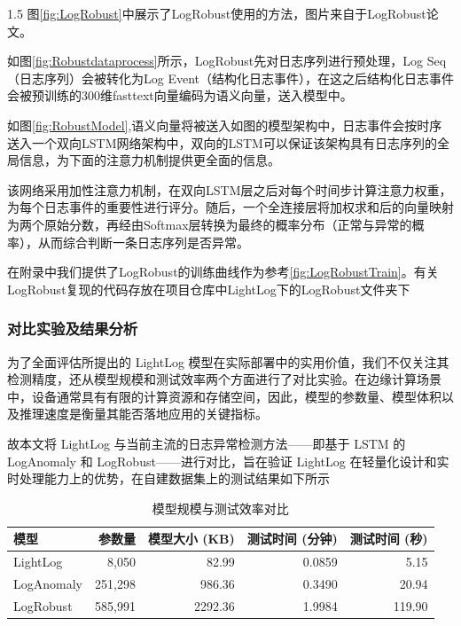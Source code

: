 \documentclass[a4paper,12pt]{report}
\begin{document}
\begin{spacing}{1.5}
图\ref{fig:LogRobust}中展示了LogRobust使用的方法，图片来自于LogRobust论文\cite{zhang2019robust}。

如图\ref{fig:Robustdataprocess}所示，LogRobust先对日志序列进行预处理，Log Seq（日志序列）会被转化为Log Event（结构化日志事件），在这之后结构化日志事件会被预训练的300维fasttext向量编码为语义向量，送入模型中。

如图\ref{fig:RobustModel},语义向量将被送入如图的模型架构中，日志事件会按时序送入一个双向LSTM网络架构中，双向的LSTM可以保证该架构具有日志序列的全局信息，为下面的注意力机制提供更全面的信息。

该网络采用加性注意力机制，在双向LSTM层之后对每个时间步计算注意力权重，为每个日志事件的重要性进行评分。随后，一个全连接层将加权求和后的向量映射为两个原始分数，再经由Softmax层转换为最终的概率分布（正常与异常的概率），从而综合判断一条日志序列是否异常。

在附录中我们提供了LogRobust的训练曲线作为参考\ref{fig:LogRobustTrain}。有关LogRobust复现的代码存放在项目仓库中LightLog下的LogRobust文件夹下


\subsubsection{对比实验及结果分析}

为了全面评估所提出的 LightLog 模型在实际部署中的实用价值，我们不仅关注其检测精度，还从模型规模和测试效率两个方面进行了对比实验。在边缘计算场景中，设备通常具有有限的计算资源和存储空间，因此，模型的参数量、模型体积以及推理速度是衡量其能否落地应用的关键指标。

故本文将 LightLog 与当前主流的日志异常检测方法——即基于 LSTM 的 LogAnomaly 和 LogRobust——进行对比，旨在验证 LightLog 在轻量化设计和实时处理能力上的优势，在自建数据集上的测试结果如下所示
\begin{table}[htbp]
	\centering
	\caption{模型规模与测试效率对比}
	\label{tab:model_comparison}
	\begin{tabular}{lrrrr}
		\toprule
		\textbf{模型} & \textbf{参数量} & \textbf{模型大小 (KB)} & \textbf{测试时间 (分钟)} & \textbf{测试时间 (秒)} \\
		\midrule
		LightLog    & 8,050   & 82.99  & 0.0859 & 5.15  \\
		LogAnomaly  & 251,298 & 986.36 & 0.3490 & 20.94 \\
		LogRobust   & 585,991 & 2292.36 & 1.9984 & 119.90 \\
		\bottomrule
	\end{tabular}
\end{table}


\end{spacing}
\end{document}
